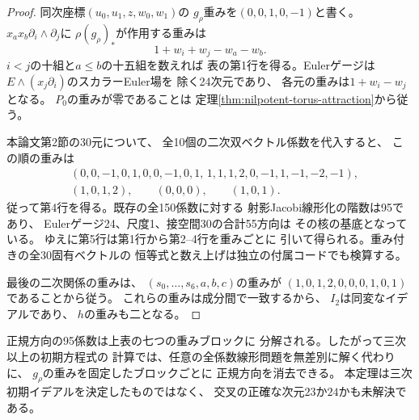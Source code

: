 \begin{proof}
同次座標$(u_0,u_1,z,w_0,w_1)$の
$g_\rho$重みを$(0,0,1,0,-1)$と書く。
$x_ax_b\partial_i\wedge\partial_j$に
$\rho(g_\rho)_*$が作用する重みは
\[
 1+w_i+w_j-w_a-w_b.
\]
$i<j$の十組と$a\le b$の十五組を数えれば
表の第1行を得る。Eulerゲージは
$E\wedge(x_j\partial_i)$のスカラーEuler場を
除く24次元であり、
各元の重みは$1+w_i-w_j$となる。
$P_0$の重みが零であることは
定理\ref{thm:nilpotent-torus-attraction}から従う。

本論文第2節の30元について、
全10個の二次双ベクトル係数を代入すると、
この順の重みは
\[
\begin{split}
 &(0,0,-1,0,1,0,0,-1,0,1,\,
   1,1,1,2,0,-1,1,-1,-2,-1),\\
 &(1,0,1,2),\qquad(0,0,0),\qquad(1,0,1).
\end{split}
\]
従って第4行を得る。既存の全150係数に対する
射影Jacobi線形化の階数は95であり、
Eulerゲージ24、尺度1、接空間30の合計55方向は
その核の基底となっている。
ゆえに第5行は第1行から第2--4行を重みごとに
引いて得られる。重み付きの全30固有ベクトルの
恒等式と数え上げは独立の付属コードでも検算する。

最後の二次関係の重みは、
$(s_0,\ldots,s_6,a,b,c)$の重みが
$(1,0,1,2,0,0,0,1,0,1)$であることから従う。
これらの重みは成分間で一致するから、
$I_2$は同変なイデアルであり、
$h$の重みも二となる。
\end{proof}

\begin{remark}[三次以上への計算上の帰結]
正規方向の95係数は上表の七つの重みブロックに
分解される。したがって三次以上の初期方程式の
計算では、任意の全係数線形問題を無差別に解く代わりに、
$g_\rho$の重みを固定したブロックごとに
正規方向を消去できる。
本定理は三次初期イデアルを決定したものではなく、
交叉の正確な次元$23$か$24$かも未解決である。
\end{remark}
